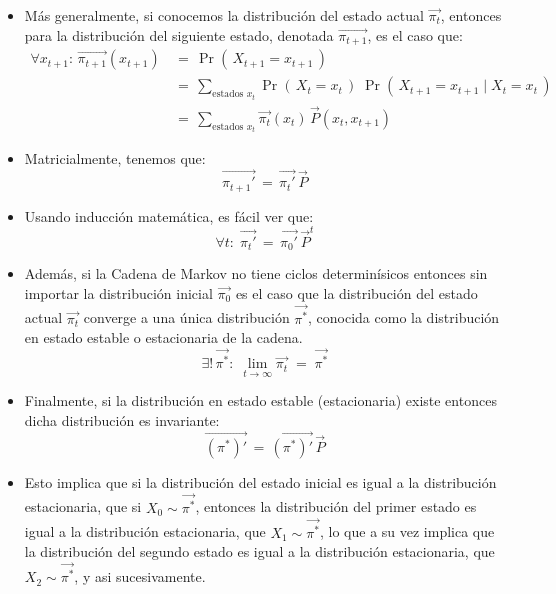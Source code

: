 \documentclass[ 10pt, xcolor = dvipsnames]{beamer}
\begin{document}
\begin{frame}[allowframebreaks]
\begin{itemize}
\item M\'as generalmente, si conocemos la distribuci\'on del estado actual $\vec{\pi_t}$, entonces para la distribuci\'on del siguiente estado, denotada $\vec{\pi_{t+1}}$, \linebreak es el caso que: 
\begin{align*}
\forall x_{t+1} \colon \, \vec{\pi_{t+1}}(x_{t+1}) \, 
& = \, \Pr( \, X_{t+1} = x_{t+1} \, ) \\[1ex]
& = \, \sum_{\text{estados } x_t} \Pr( \, X_t = x_t \, ) \; \Pr( \, X_{t+1} = x_{t+1} \mid X_t = x_t \, ) \\[1ex]
& = \, \sum_{\text{estados } x_t} \vec{\pi_t}(x_t) \, \vec{P}(x_t,x_{t+1})
\end{align*}
\item Matricialmente, tenemos que: 
\[
\vec{\pi_{t+1}'} \, = \, \vec{\pi_t'} \, \vec{P}
\]
\end{itemize}
\framebreak

\begin{itemize}
\item Usando inducci\'on matem\'atica, es f\'acil ver que: 
\[
\forall t \colon \;
\vec{\pi_t'} \, = \, \vec{\pi_0'} \, \vec{P}^t
\]
\item Adem\'as, si la Cadena de Markov no tiene ciclos determin\'isicos entonces \linebreak sin importar la distribuci\'on inicial $\vec{\pi_0}$ es el caso que la distribuci\'on del \linebreak estado actual $\vec{\pi_t}$ converge a una \'unica distribuci\'on $\vec{\pi^*}$, conocida como la distribuci\'on en estado estable o estacionaria de la cadena. \Iec 
\[
\exists! \, \vec{\pi^*} \colon \;
\lim_{ t \rightarrow \infty } \vec{\pi_t} \; = \;
\vec{\pi^*}
\]
\end{itemize}
\framebreak

\begin{itemize}
\item Finalmente, si la distribuci\'on en estado estable (estacionaria) existe entonces dicha distribuci\'on es invariante: 
\[
\vec{(\pi^*)'} \, = \, \vec{(\pi^*)'} \, \vec{P}
\]
\item Esto implica que si la distribuci\'on del estado inicial es igual a la distribuci\'on estacionaria, \ie que si $X_0 \sim \vec{\pi^*}$, entonces la distribuci\'on del primer estado es igual a la distribuci\'on estacionaria, \ie que $X_1 \sim \vec{\pi^*}$, lo que a su vez implica que la distribuci\'on del segundo estado es igual a la distribuci\'on estacionaria, \ie que $X_2 \sim \vec{\pi^*}$, y asi sucesivamente. 
\end{itemize}

\end{frame}
\end{document}
